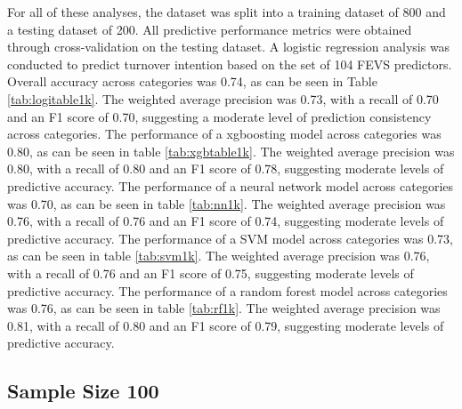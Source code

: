 \documentclass[
  man]{apa7}
\begin{document}
For all of these analyses, the dataset was split into a training dataset of 800 and a testing dataset of 200. All predictive performance metrics were obtained through cross-validation on the testing dataset. A logistic regression analysis was conducted to predict turnover intention based on the set of 104 FEVS predictors. Overall accuracy across categories was 0.74, as can be seen in Table \ref{tab:logitable1k}. The weighted average precision was 0.73, with a recall of 0.70 and an F1 score of 0.70, suggesting a moderate level of prediction consistency across categories.
The performance of a xgboosting model across categories was 0.80, as can be seen in table \ref{tab:xgbtable1k}. The weighted average precision was 0.80, with a recall of 0.80 and an F1 score of 0.78, suggesting moderate levels of predictive accuracy.
The performance of a neural network model across categories was 0.70, as can be seen in table \ref{tab:nn1k}. The weighted average precision was 0.76, with a recall of 0.76 and an F1 score of 0.74, suggesting moderate levels of predictive accuracy.
The performance of a SVM model across categories was 0.73, as can be seen in table \ref{tab:svm1k}. The weighted average precision was 0.76, with a recall of 0.76 and an F1 score of 0.75, suggesting moderate levels of predictive accuracy.
The performance of a random forest model across categories was 0.76, as can be seen in table \ref{tab:rf1k}. The weighted average precision was 0.81, with a recall of 0.80 and an F1 score of 0.79, suggesting moderate levels of predictive accuracy.

\hypertarget{sample-size-100}{%
\subsection{Sample Size 100}\label{sample-size-100}}
\end{document}
